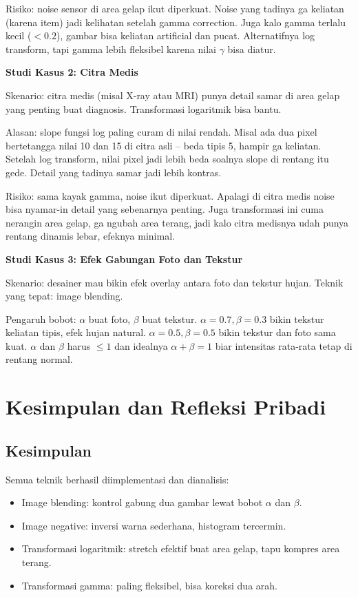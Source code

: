 \documentclass[11pt,a4paper]{article}
\begin{document}
Risiko: noise sensor di area gelap ikut diperkuat. Noise yang tadinya ga keliatan (karena item) jadi kelihatan setelah gamma correction. Juga kalo gamma terlalu kecil ($< 0.2$), gambar bisa keliatan artificial dan pucat. Alternatifnya log transform, tapi gamma lebih fleksibel karena nilai $\gamma$ bisa diatur.

\textbf{Studi Kasus 2: Citra Medis}

Skenario: citra medis (misal X-ray atau MRI) punya detail samar di area gelap yang penting buat diagnosis. Transformasi logaritmik bisa bantu.

Alasan: slope fungsi log paling curam di nilai rendah. Misal ada dua pixel bertetangga nilai 10 dan 15 di citra asli -- beda tipis 5, hampir ga keliatan. Setelah log transform, nilai pixel jadi lebih beda soalnya slope di rentang itu gede. Detail yang tadinya samar jadi lebih kontras.

Risiko: sama kayak gamma, noise ikut diperkuat. Apalagi di citra medis noise bisa nyamar-in detail yang sebenarnya penting. Juga transformasi ini cuma nerangin area gelap, ga ngubah area terang, jadi kalo citra medisnya udah punya rentang dinamis lebar, efeknya minimal.

\textbf{Studi Kasus 3: Efek Gabungan Foto dan Tekstur}

Skenario: desainer mau bikin efek overlay antara foto dan tekstur hujan. Teknik yang tepat: image blending.

Pengaruh bobot: $\alpha$ buat foto, $\beta$ buat tekstur. $\alpha = 0.7, \beta = 0.3$ bikin tekstur keliatan tipis, efek hujan natural. $\alpha = 0.5, \beta = 0.5$ bikin tekstur dan foto sama kuat. $\alpha$ dan $\beta$ harus $\leq 1$ dan idealnya $\alpha + \beta = 1$ biar intensitas rata-rata tetap di rentang normal.

\section{Kesimpulan dan Refleksi Pribadi}

\subsection{Kesimpulan}

Semua teknik berhasil diimplementasi dan dianalisis:
\begin{itemize}
    \item Image blending: kontrol gabung dua gambar lewat bobot $\alpha$ dan $\beta$.
    \item Image negative: inversi warna sederhana, histogram tercermin.
    \item Transformasi logaritmik: stretch efektif buat area gelap, tapu kompres area terang.
    \item Transformasi gamma: paling fleksibel, bisa koreksi dua arah.
\end{itemize}
\end{document}
